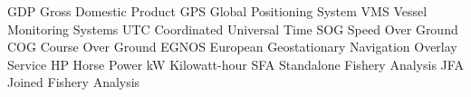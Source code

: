 
 {GDP} {Gross Domestic Product}
 {GPS} {Global Positioning System}
 {VMS} {Vessel Monitoring Systems}
 {UTC} {Coordinated Universal Time}
 {SOG} {Speed Over Ground}
 {COG} {Course Over Ground}
 {EGNOS} {European Geostationary Navigation Overlay Service}
 {HP} {Horse Power}
 {kW} {Kilowatt-hour}
 {SFA} {Standalone Fishery Analysis}
 {JFA} {Joined Fishery Analysis}
 
 


